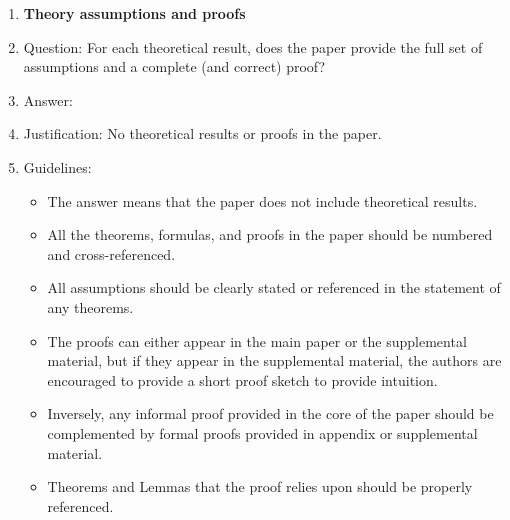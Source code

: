 \begin{enumerate}
\begin{itemize}
        \item If applicable, the authors should discuss possible limitations of their approach to address problems of privacy and fairness.
        \item While the authors might fear that complete honesty about limitations might be used by reviewers as grounds for rejection, a worse outcome might be that reviewers discover limitations that aren't acknowledged in the paper. The authors should use their best judgment and recognize that individual actions in favor of transparency play an important role in developing norms that preserve the integrity of the community. Reviewers will be specifically instructed to not penalize honesty concerning limitations.
    \end{itemize}

\item {\bf Theory assumptions and proofs}
    \item[] Question: For each theoretical result, does the paper provide the full set of assumptions and a complete (and correct) proof?
    \item[] Answer: \answerNA{}
    \item[] Justification: No theoretical results or proofs in the paper.
    \item[] Guidelines:
    \begin{itemize}
        \item The answer \answerNA{} means that the paper does not include theoretical results. 
        \item All the theorems, formulas, and proofs in the paper should be numbered and cross-referenced.
        \item All assumptions should be clearly stated or referenced in the statement of any theorems.
        \item The proofs can either appear in the main paper or the supplemental material, but if they appear in the supplemental material, the authors are encouraged to provide a short proof sketch to provide intuition. 
        \item Inversely, any informal proof provided in the core of the paper should be complemented by formal proofs provided in appendix or supplemental material.
        \item Theorems and Lemmas that the proof relies upon should be properly referenced. 
    \end{itemize}


\end{enumerate}
